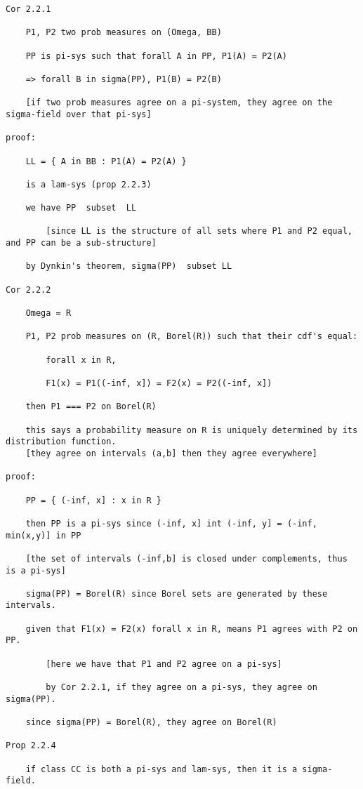 \documentclass{article}
\begin{document}
\begin{flushleft}
\begin{verbatim}
Cor 2.2.1 

	P1, P2 two prob measures on (Omega, BB)
	
	PP is pi-sys such that forall A in PP, P1(A) = P2(A)
	
	=> forall B in sigma(PP), P1(B) = P2(B)
	
	[if two prob measures agree on a pi-system, they agree on the sigma-field over that pi-sys]
	
proof:

	LL = { A in BB : P1(A) = P2(A) }
	
	is a lam-sys (prop 2.2.3)
	
	we have PP  subset  LL
	
		[since LL is the structure of all sets where P1 and P2 equal, and PP can be a sub-structure]
		
	by Dynkin's theorem, sigma(PP)  subset LL
	
Cor 2.2.2

	Omega = R
	
	P1, P2 prob measures on (R, Borel(R)) such that their cdf's equal:
	
		forall x in R, 
		
		F1(x) = P1((-inf, x]) = F2(x) = P2((-inf, x])
		
	then P1 === P2 on Borel(R)
	
	this says a probability measure on R is uniquely determined by its distribution function.
	[they agree on intervals (a,b] then they agree everywhere]
	
proof:

	PP = { (-inf, x] : x in R }
	
	then PP is a pi-sys since (-inf, x] int (-inf, y] = (-inf, min(x,y)] in PP
	
	[the set of intervals (-inf,b] is closed under complements, thus is a pi-sys]
	
	sigma(PP) = Borel(R) since Borel sets are generated by these intervals. 
	
	given that F1(x) = F2(x) forall x in R, means P1 agrees with P2 on PP.
		
		[here we have that P1 and P2 agree on a pi-sys]
		
		by Cor 2.2.1, if they agree on a pi-sys, they agree on sigma(PP).
		
	since sigma(PP) = Borel(R), they agree on Borel(R)
		
Prop 2.2.4

	if class CC is both a pi-sys and lam-sys, then it is a sigma-field.
	

\end{verbatim}
\end{flushleft}
\end{document}
